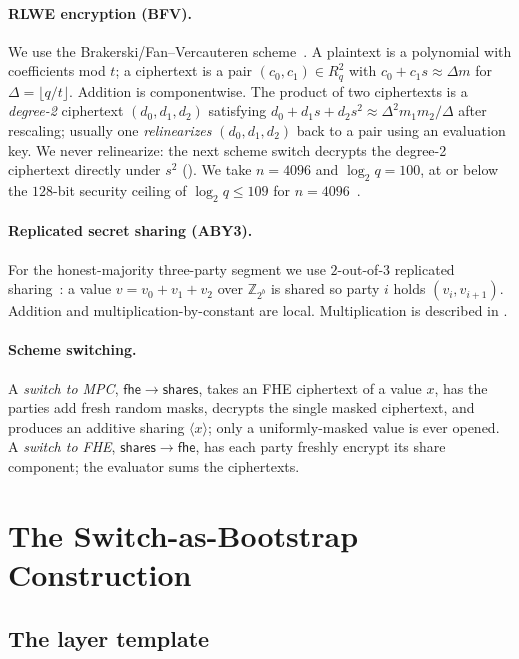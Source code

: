 \documentclass[11pt]{article}
\theoremstyle{plain}
\theoremstyle{definition}
\theoremstyle{remark}
\newcommand{\Z}{\mathbb{Z}}
\newcommand{\toMPC}{\mathsf{fhe{\to}shares}}
\newcommand{\toFHE}{\mathsf{shares{\to}fhe}}
\begin{document}
\paragraph{RLWE encryption (BFV).}\label{par:bfv}
We use the Brakerski/Fan--Vercauteren scheme~\cite{FV}. A plaintext is a
polynomial with coefficients mod $t$; a ciphertext is a pair
$(c_0,c_1)\in R_q^2$ with $c_0 + c_1 s \approx \Delta m$ for
$\Delta=\lfloor q/t\rfloor$. Addition is componentwise. The product of two
ciphertexts is a \emph{degree-2} ciphertext $(d_0,d_1,d_2)$ satisfying
$d_0 + d_1 s + d_2 s^2 \approx \Delta^2 m_1 m_2 / \Delta$ after rescaling;
usually one \emph{relinearizes} $(d_0,d_1,d_2)$ back to a pair using an
evaluation key. We never relinearize: the next scheme switch decrypts the
degree-2 ciphertext directly under $s^2$
(). We take $n=4096$ and $\log_2 q = 100$, at or below the
$128$-bit security ceiling of $\log_2 q \le 109$ for
$n=4096$~\cite{HEStandard}.

\paragraph{Replicated secret sharing (ABY3).}\label{par:rss}
For the honest-majority three-party segment we use $2$-out-of-$3$ replicated
sharing~\cite{ABY3}: a value $v=v_0+v_1+v_2$ over $\Z_{2^b}$ is shared so
party $i$ holds $(v_i, v_{i+1})$. Addition and multiplication-by-constant
are local. Multiplication is described in .

\paragraph{Scheme switching.} A \emph{switch to MPC}, $\toMPC$, takes an FHE
ciphertext of a value $x$, has the parties add fresh random masks, decrypts
the single masked ciphertext, and produces an additive sharing
$\langle x\rangle$; only a uniformly-masked value is ever opened. A
\emph{switch to FHE}, $\toFHE$, has each party freshly encrypt its share
component; the evaluator sums the ciphertexts.

\section{The Switch-as-Bootstrap Construction}\label{sec:construction}

\subsection{The layer template}
\end{document}
